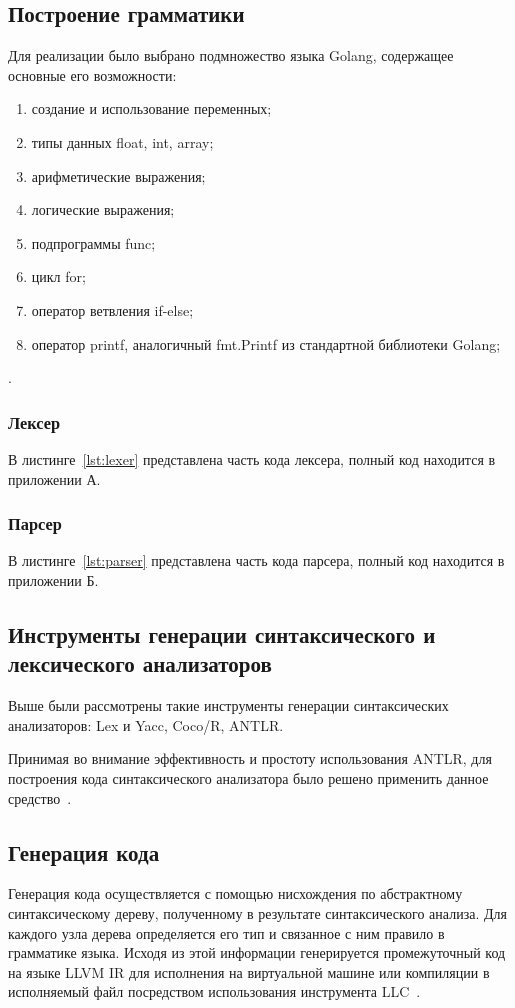 \subsection{Построение грамматики}\label{subsec:grammar}
Для реализации было выбрано подмножество языка Golang, содержащее основные его возможности:
\begin{enumerate}
    \item создание и использование переменных;
    \item типы данных float, int, array;
    \item арифметические выражения;
    \item логические выражения;
    \item подпрограммы func;
    \item цикл for;
    \item оператор ветвления if-else;
    \item оператор printf, аналогичный fmt.Printf из стандартной библиотеки Golang;
\end{enumerate}.

\subsubsection{Лексер}\label{subsubsec:lexer}
В листинге~\ref{lst:lexer} представлена часть кода лексера, полный код находится в приложении А.
\begingroup

\endgroup

\subsubsection{Парсер}\label{subsubsec:parser}
В листинге~\ref{lst:parser} представлена часть кода парсера, полный код находится в приложении Б.
\begingroup

\endgroup

\subsection{Инструменты генерации синтаксического и лексического анализаторов}\label{subsec:tools}
Выше были рассмотрены такие инструменты генерации синтаксических анализаторов: Lex и Yacc, Coco/R, ANTLR.

Принимая во внимание эффективность и простоту использования ANTLR, для построения кода синтаксического анализатора
было решено применить данное средство~\cite{antlr}.

\subsection{Генерация кода}\label{subsec:generation}
Генерация кода осуществляется с помощью нисхождения по абстрактному синтаксическому дереву,
полученному в результате синтаксического анализа.
Для каждого узла дерева определяется его тип и связанное с ним правило в грамматике языка.
Исходя из этой информации генерируется промежуточный код на языке LLVM IR для исполнения на виртуальной машине или
компиляции в исполняемый файл посредством использования инструмента LLC~\cite{llvm}.